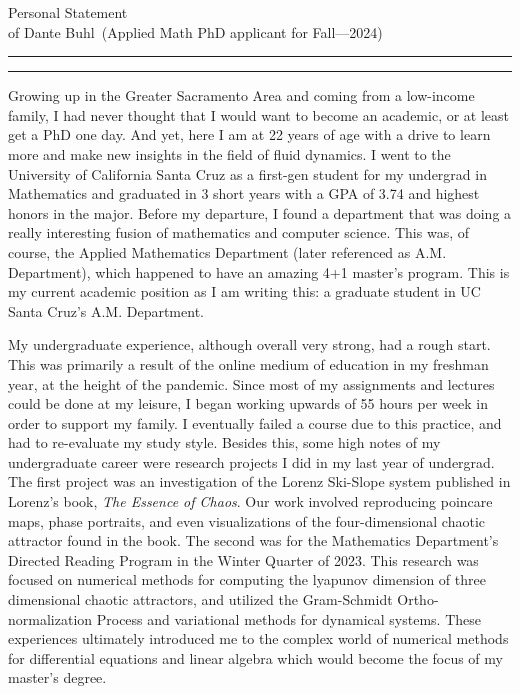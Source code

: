 \documentclass{article}
\newcommand{\soptitle}{Personal Statement}
\newcommand{\yourname}{Dante Buhl}
\begin{document}
\begin{center}\LARGE\soptitle\\
\large of \yourname\ (Applied Math PhD applicant for Fall---2024)
\end{center}

\hrule
\vspace{1pt}
\hrule height 1pt

\bigskip

\large
Growing up in the Greater Sacramento Area and coming from a low-income family, I had never thought that I would want to become an academic, or at least get a PhD one day. And yet, here I am at 22 years of age with a drive to learn more and make new insights in the field of fluid dynamics. I went to the University of California Santa Cruz as a first-gen student for my undergrad in Mathematics and graduated in 3 short years with a GPA of 3.74 and highest honors in the major. Before my departure, I found a department that was doing a really interesting fusion of mathematics and computer science. This was, of course, the Applied Mathematics Department (later referenced as A.M. Department), which happened to have an amazing 4+1 master's program. This is my current academic position as I am writing this: a graduate student in UC Santa Cruz's A.M. Department. 

My undergraduate experience, although overall very strong, had a rough start. This was primarily a result of the online medium of education in my freshman year, at the height of the pandemic. Since most of my assignments and lectures could be done at my leisure, I began working upwards of 55 hours per week in order to support my family. I eventually failed a course due to this practice, and had to re-evaluate my study style. Besides this, some high notes of my undergraduate career were research projects I did in my last year of undergrad. The first project was an investigation of the Lorenz Ski-Slope system published in Lorenz's book, \textit{The Essence of Chaos}. Our work involved reproducing poincare maps, phase portraits, and even visualizations of the four-dimensional chaotic attractor found in the book. The second was for the Mathematics Department's Directed Reading Program in the Winter Quarter of 2023. This research was focused on numerical methods for computing the lyapunov dimension of three dimensional chaotic attractors, and utilized the Gram-Schmidt Ortho-normalization Process and variational methods for dynamical systems. These experiences ultimately introduced me to the complex world of numerical methods for differential equations and linear algebra which would become the focus of my master's degree. 
\end{document}
